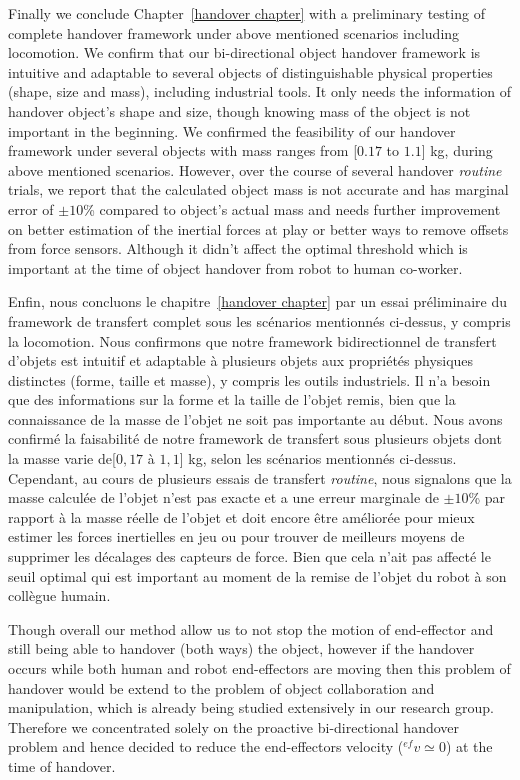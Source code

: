 Finally we conclude Chapter~\ref{handover chapter} with a preliminary testing of complete handover framework under above mentioned scenarios including locomotion. We confirm that our bi-directional object handover framework is intuitive and adaptable to several objects of distinguishable physical properties (shape, size and mass), including  industrial tools. It only needs the information of handover object's shape and size, though knowing mass of the object is not important in the beginning. We confirmed the feasibility of our handover framework under several objects with mass ranges from [$0.17$ to $1.1$] kg, during above mentioned scenarios. However, over the course of several handover \textit{routine} trials, we report that the calculated object mass is not accurate and has marginal error of $ \pm10 $\% compared to object's actual mass and needs further improvement on better estimation of the inertial forces at play or  better ways to remove offsets from force sensors. Although it didn't affect the optimal threshold which is important at the time of object handover from robot to human co-worker.

Enfin, nous concluons le chapitre~\ref{handover chapter} par un essai préliminaire du framework de transfert complet sous les scénarios mentionnés ci-dessus, y compris la locomotion. Nous confirmons que notre framework bidirectionnel de transfert d'objets est intuitif et adaptable à plusieurs objets aux propriétés physiques distinctes (forme, taille et masse), y compris les outils industriels. Il n'a besoin que des informations sur la forme et la taille de l'objet remis, bien que la connaissance de la masse de l'objet ne soit pas importante au début. Nous avons confirmé la faisabilité de notre framework de transfert sous plusieurs objets dont la masse varie de[$0,17 $ à $ 1,1 $] kg, selon les scénarios mentionnés ci-dessus. Cependant, au cours de plusieurs essais de transfert \textit{routine}, nous signalons que la masse calculée de l'objet n'est pas exacte et a une erreur marginale de $ \pm10 $\% par rapport à la masse réelle de l'objet et doit encore être améliorée pour mieux estimer les forces inertielles en jeu ou pour trouver de meilleurs moyens de supprimer les décalages des capteurs de force. Bien que cela n'ait pas affecté le seuil optimal qui est important au moment de la remise de l'objet du robot à son collègue humain.



Though overall our method allow us to not stop the motion of end-effector and still being able to handover (both ways) the object, however if the handover occurs while both human and robot end-effectors are moving then this problem of handover would be extend to the problem of object collaboration and manipulation, which is already being studied extensively in our research group. Therefore we concentrated solely on the proactive bi-directional handover problem and hence decided to reduce the end-effectors velocity (${}^{ef}v\simeq0$) at the time of handover. 

